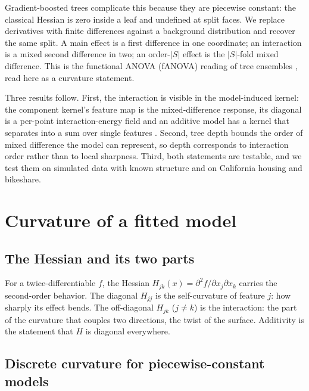 \documentclass[11pt]{article}
\begin{document}
Gradient-boosted trees complicate this because they are piecewise constant: the
classical Hessian is zero inside a leaf and undefined at split faces. We replace
derivatives with finite differences against a background distribution and recover
the same split. A main effect is a first difference in one coordinate; an
interaction is a mixed second difference in two; an order-$|S|$ effect is the
$|S|$-fold mixed difference. This is the functional ANOVA (fANOVA) reading of tree
ensembles \cite{Sudjianto2025,Hu2023}, read here as a curvature statement.

Three results follow. First, the interaction is visible in the model-induced
kernel: the component kernel's feature map is the mixed-difference response, its
diagonal is a per-point interaction-energy field and an additive model has a
kernel that separates into a sum over single features \cite{SudjiantoZhang2026}.
Second, tree depth bounds the order of mixed difference the model can represent,
so depth corresponds to interaction order rather than to local sharpness. Third,
both statements are testable, and we test them on simulated data with known
structure and on California housing and bikeshare.

\section{Curvature of a fitted model}

\subsection{The Hessian and its two parts}

For a twice-differentiable $f$, the Hessian $H_{jk}(x)=\partial^2 f/\partial
x_j\partial x_k$ carries the second-order behavior. The diagonal $H_{jj}$ is the
self-curvature of feature $j$: how sharply its effect bends. The off-diagonal
$H_{jk}$ ($j\neq k$) is the interaction: the part of the curvature that couples
two directions, the twist of the surface. Additivity is the statement that $H$ is
diagonal everywhere.

\subsection{Discrete curvature for piecewise-constant models}
\end{document}
